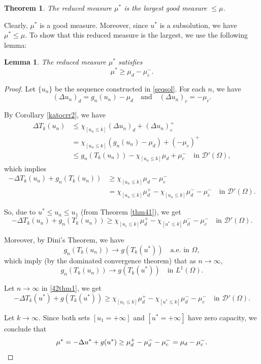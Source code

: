 \documentclass[a4paper, 11pt]{report}
\newtheorem{thm}{Theorem}[chapter]
\newtheorem{lmm}{Lemma}[chapter]
\theoremstyle{definition}\newtheorem*{rmk}{Remark}
\begin{document}
\begin{thm}\label{thm42}
The reduced measure $\mu^*$ is the largest good measure $\le \mu$.
\end{thm}

Clearly, $\mu^*$ is a good measure. Moreover, since $u^*$ is a subsolution, we have $\mu^* \le \mu$. To show that this reduced measure is the largest, we use the following lemma:

\begin{lmm}\label{43lmm}
The reduced measure $\mu^*$ satisfies
\[
\mu^* \ge \mu_d - \mu_c^-.
\]
\end{lmm}

\begin{proof}
\mbox{}

Let $\{u_n\}$ be the sequence constructed in \eqref{seqsol}. For each $n$, we have
\[
(\Delta u_n)_d = g_n(u_n) - \mu_d \quad\text{and}\quad (\Delta u_n)_c = -\mu_c.
\]

By Corollary \ref{katocrr2}, we have
\begin{align*}
\Delta T_k(u_n) & \le \chi_{[u_n\le k]}(\Delta u_n)_d + (\Delta u_n)_c^+\\
&= \chi_{[u_n\le k]}( g_n(u_n)-\mu_d ) + (-\mu_c)^+\\
&\le g_n(T_k(u_n)) - \chi_{[u_n\le k]}\mu_d + \mu_c^-  \quad\text{in } \mathcal{D}'(\Omega),
\end{align*}
which implies
\begin{align*}
-\Delta T_k(u_n) + g_n(T_k(u_n)) &\ge \chi_{[u_n\le k]}\mu_d - \mu_c^- \\
&= \chi_{[u_n\le k]}\mu_d^+ - \chi_{[u_n\le k]}\mu_d^- - \mu_c^- \quad \text{in }\mathcal{D}'(\Omega).
\end{align*}

So, due to $u^* \le u_n \le u_1$ (from Theorem \ref{thm41}), we get
\begin{equation}\label{42thm1}
-\Delta T_k(u_n) + g_n(T_k(u_n)) \ge \chi_{[u_1 \le k]}\mu_d^+ - \chi_{[u^*\le k]}\mu_d^- -\mu_c^- \quad \text{in }\mathcal{D}'(\Omega).
\end{equation}

Moreover, by Dini's Theorem, we have
\[
g_n(T_k(u_n)) \to g(T_k(u^*)) \quad\text{a.e.\ in }\Omega,
\]
which imply (by the dominated convergence theorem) that as $n \to \infty$,
\[
g_n(T_k(u_n)) \to g(T_k(u^*)) \quad\text{in }L^1(\Omega).
\]

Let $n\to \infty$ in \eqref{42thm1}, we get
\[
-\Delta T_k(u^*) + g(T_k(u^*)) \ge \chi_{[u_1 \le k]}\mu_d^+ - \chi_{[u^*\le k]}\mu_d^- -\mu_c^- \quad \text{in }\mathcal{D}'(\Omega).
\]

Let $k \to \infty$. Since both sets $[u_1 = +\infty]$ and $[u^* = +\infty]$ have zero capacity, we conclude that 
\[
\mu^* = -\Delta u^* + g(u^*) \ge \mu_d^+ - \mu_d^- -\mu_c^- = \mu_d - \mu_c^-.\qedhere
\]
\end{proof}
\end{document}
